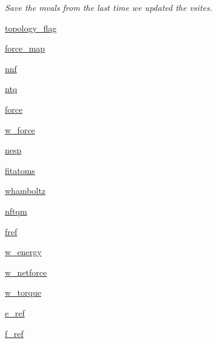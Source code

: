 \begin{DoxyCompactItemize}
\begin{DoxyCompactList}\small\item\em \-Save the mvals from the last time we updated the vsites. \end{DoxyCompactList}\item 
\hyperlink{classforcebalance_1_1abinitio_1_1AbInitio_a32164696f808febd50eafae10d10a7e7}{topology\-\_\-flag}
\item 
\hyperlink{classforcebalance_1_1abinitio_1_1AbInitio_ab5b58642be0ba7651c16031f955189dc}{force\-\_\-map}
\item 
\hyperlink{classforcebalance_1_1abinitio_1_1AbInitio_aa4eadda3b8377b783dec2d327cb66fa6}{nnf}
\item 
\hyperlink{classforcebalance_1_1abinitio_1_1AbInitio_a88902db5981ca2088a7cf47f5f9aa83a}{ntq}
\item 
\hyperlink{classforcebalance_1_1abinitio_1_1AbInitio_a54baa14272a2312e0fe1b77a0554c0aa}{force}
\item 
\hyperlink{classforcebalance_1_1abinitio_1_1AbInitio_a2f68f2c95e481c03e05b03d55851107f}{w\-\_\-force}
\item 
\hyperlink{classforcebalance_1_1abinitio_1_1AbInitio_a15710ca46f6141a6e5b00a382aa56632}{nesp}
\item 
\hyperlink{classforcebalance_1_1abinitio_1_1AbInitio_a2fba4108ea80f3e1f44cf4c96cd6d530}{fitatoms}
\item 
\hyperlink{classforcebalance_1_1abinitio_1_1AbInitio_a8f3cbe570dfaf74f84f71817cd3fb008}{whamboltz}
\item 
\hyperlink{classforcebalance_1_1abinitio_1_1AbInitio_add8cbee2d95e5702d7a0d1538f26539a}{nftqm}
\item 
\hyperlink{classforcebalance_1_1abinitio_1_1AbInitio_a89697453350c3013d227c3037608d51f}{fref}
\item 
\hyperlink{classforcebalance_1_1abinitio_1_1AbInitio_ab8c3b9a3e74ced53cc5f4e6f3c6c06ef}{w\-\_\-energy}
\item 
\hyperlink{classforcebalance_1_1abinitio_1_1AbInitio_aa9fa8ad127d442e9b545088eb741b9eb}{w\-\_\-netforce}
\item 
\hyperlink{classforcebalance_1_1abinitio_1_1AbInitio_ab4468582c2c010bec490e65a34cdc40a}{w\-\_\-torque}
\item 
\hyperlink{classforcebalance_1_1abinitio_1_1AbInitio_a0fa6ba3ce272657e4f284267b35574ad}{e\-\_\-ref}
\item 
\hyperlink{classforcebalance_1_1abinitio_1_1AbInitio_a945a7463f68474234fa8fdfe93888ff1}{f\-\_\-ref}
\item 

\end{DoxyCompactItemize}

